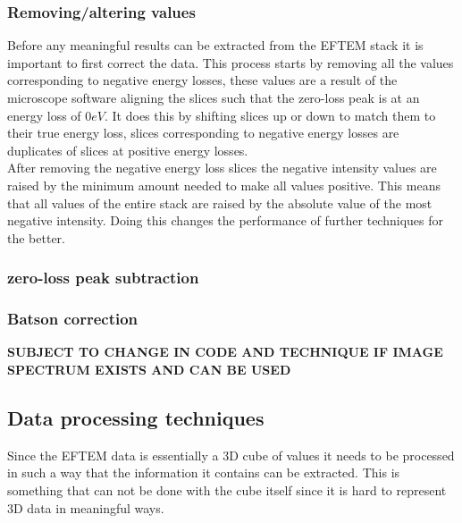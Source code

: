 \subsubsection{Removing/altering values}
Before any meaningful results can be extracted from the EFTEM stack it is important to first correct the data.
This process starts by removing all the values corresponding to negative energy losses, these values are a result of the microscope software aligning the slices such that the zero-loss peak is at an energy loss of $0eV$.
It does this by shifting slices up or down to match them to their true energy loss, slices corresponding to negative energy losses are duplicates of slices at positive energy losses.\\
After removing the negative energy loss slices the negative intensity values are raised by the minimum amount needed to make all values positive.
This means that all values of the entire stack are raised by the absolute value of the most negative intensity. Doing this changes the performance of further techniques for the better.\\

\subsubsection{zero-loss peak subtraction}



\subsubsection{Batson correction}
\textbf{SUBJECT TO CHANGE IN CODE AND TECHNIQUE IF IMAGE SPECTRUM EXISTS AND CAN BE USED}


\subsection{Data processing techniques}
Since the EFTEM data is essentially a 3D cube of values it needs to be processed in such a way that the information it contains can be extracted. This is something that can not be done with the cube itself since it is hard to represent 3D data in meaningful ways.

